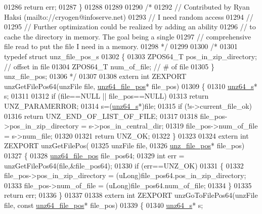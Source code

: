 \begin{DoxyCode}
01286     \textcolor{keywordflow}{return} err;
01287 \}
01288 
01289 
01290 \textcolor{comment}{/*}
01292 \textcolor{comment}{// Contributed by Ryan Haksi (mailto://cryogen@infoserve.net)}
01293 \textcolor{comment}{// I need random access}
01294 \textcolor{comment}{//}
01295 \textcolor{comment}{// Further optimization could be realized by adding an ability}
01296 \textcolor{comment}{// to cache the directory in memory. The goal being a single}
01297 \textcolor{comment}{// comprehensive file read to put the file I need in a memory.}
01298 \textcolor{comment}{*/}
01299 
01300 \textcolor{comment}{/*}
01301 \textcolor{comment}{typedef struct unz\_file\_pos\_s}
01302 \textcolor{comment}{\{}
01303 \textcolor{comment}{    ZPOS64\_T pos\_in\_zip\_directory;   // offset in file}
01304 \textcolor{comment}{    ZPOS64\_T num\_of\_file;            // # of file}
01305 \textcolor{comment}{\} unz\_file\_pos;}
01306 \textcolor{comment}{*/}
01307 
01308 \textcolor{keyword}{extern} \textcolor{keywordtype}{int} ZEXPORT unzGetFilePos64(unzFile file, \hyperlink{structunz64__file__pos__s}{unz64\_file\_pos}*  file\_pos)
01309 \{
01310     \hyperlink{structunz64__s}{unz64\_s}* s;
01311 
01312     \textcolor{keywordflow}{if} (file==NULL || file\_pos==NULL)
01313         \textcolor{keywordflow}{return} UNZ\_PARAMERROR;
01314     s=(\hyperlink{structunz64__s}{unz64\_s}*)file;
01315     \textcolor{keywordflow}{if} (!s->current\_file\_ok)
01316         \textcolor{keywordflow}{return} UNZ\_END\_OF\_LIST\_OF\_FILE;
01317 
01318     file\_pos->pos\_in\_zip\_directory  = s->pos\_in\_central\_dir;
01319     file\_pos->num\_of\_file           = s->num\_file;
01320 
01321     \textcolor{keywordflow}{return} UNZ\_OK;
01322 \}
01323 
01324 \textcolor{keyword}{extern} \textcolor{keywordtype}{int} ZEXPORT unzGetFilePos(
01325     unzFile file,
01326     \hyperlink{structunz__file__pos__s}{unz\_file\_pos}* file\_pos)
01327 \{
01328     \hyperlink{structunz64__file__pos__s}{unz64\_file\_pos} file\_pos64;
01329     \textcolor{keywordtype}{int} err = unzGetFilePos64(file,&file\_pos64);
01330     \textcolor{keywordflow}{if} (err==UNZ\_OK)
01331     \{
01332         file\_pos->pos\_in\_zip\_directory = (uLong)file\_pos64.pos\_in\_zip\_directory;
01333         file\_pos->num\_of\_file = (uLong)file\_pos64.num\_of\_file;
01334     \}
01335     \textcolor{keywordflow}{return} err;
01336 \}
01337 
01338 \textcolor{keyword}{extern} \textcolor{keywordtype}{int} ZEXPORT unzGoToFilePos64(unzFile file, \textcolor{keyword}{const} \hyperlink{structunz64__file__pos__s}{unz64\_file\_pos}* file\_pos)
01339 \{
01340     \hyperlink{structunz64__s}{unz64\_s}* s;

\end{DoxyCode}
